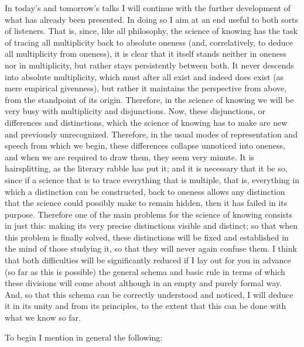 In today’s and tomorrow’s talks I will continue
with the further development of
what has already been presented.
In doing so I aim at an end
useful to both sorts of listeners.
That is, since, like all philosophy,
the science of knowing has the task of
tracing all multiplicity back to absolute oneness
(and, correlatively, to deduce all multiplicity from oneness),
it is clear that it itself stands
neither in oneness nor in multiplicity,
but rather stays persistently between both.
It never descends into absolute multiplicity,
which must after all exist and indeed does exist
(as mere empirical givenness),
but rather it maintains the perspective from above,
from the standpoint of its origin.
Therefore, in the science of knowing we will be
very busy with multiplicity and disjunctions.
Now, these disjunctions, or differences and distinctions,
which the science of knowing has to make
are new and previously unrecognized.
Therefore, in the usual modes of representation
and speech from which we begin,
these differences collapse unnoticed into oneness,
and when we are required to draw them,
they seem very minute.
It is hairsplitting, as the literary rabble has put it;
and it is necessary that it be so,
since if a science that is to trace
everything that is multiple, that is,
everything in which a distinction can be constructed,
back to oneness allows any distinction
that the science could possibly make to remain hidden,
then it has failed in its purpose.
Therefore one of the main problems for
the science of knowing consists in just this:
making its very precise distinctions visible and distinct;
so that when this problem is finally solved,
these distinctions will be fixed and established
in the mind of those studying it,
so that they will never again confuse them.
I think that both difficulties
will be significantly reduced
if I lay out for you in advance
(so far as this is possible)
the general schema and basic rule
in terms of which these divisions will come about
although in an empty and purely formal way.
And, so that this schema can be
correctly understood and noticed,
I will deduce it in its unity
and from its principles,
to the extent that this can be done
with what we know so far.

To begin I mention in general the following:

